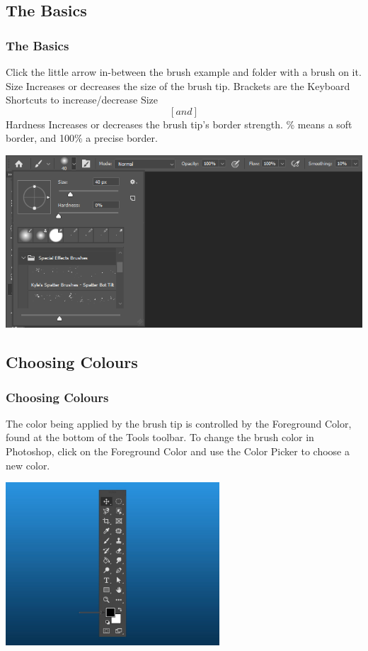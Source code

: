 \documentclass{beamer}
\begin{document}
\subsection{The Basics}
\begin{frame}
		\frametitle{The Basics}

	\begin{outline}
		\1 Click the little arrow in-between the brush example and folder with a brush on it.
		\1 Size
		\2 Increases or decreases the size of the brush tip.
		\2 Brackets are the Keyboard Shortcuts to increase/decrease Size
		\3 $$\left[ and \right]$$
		\1 Hardness
		\2 Increases or decreases the brush tip's border strength.
		\% means a soft border, and 100\% a precise border. 
	\end{outline}
\begin{center}
	\includegraphics[width=.7\textwidth]{images/brush tool basics.png}
	\end{center}
\end{frame}

\subsection{Choosing Colours}
\begin{frame}
	\frametitle{Choosing Colours}
	\begin{outline}
		\1 The color being applied by the brush tip is controlled by the Foreground Color, found at the bottom of the Tools toolbar. 
		\1 To change the brush color in Photoshop, click on the Foreground Color and use the Color Picker to choose a new color. 
	\end{outline}
	\begin{center}
		\includegraphics[width = 0.6\textwidth]{images/2.2.jpg}
	\end{center}
\end{frame}
\end{document}
